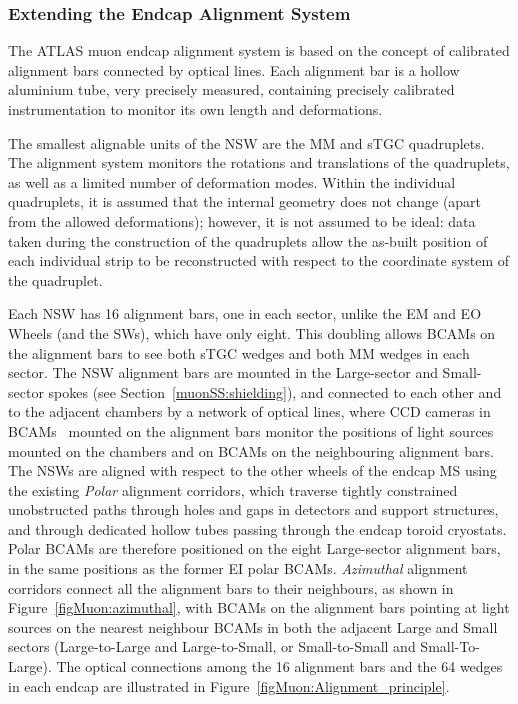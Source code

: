 \documentclass[cernpreprint, atlasdraft=false, UKenglish,british,orcidlogo, texmf, orcidlogo]{atlasdoc}
\begin{document}
\subsubsection{Extending the Endcap Alignment System \label{muonSS:alignment}} 
The ATLAS muon endcap alignment system\cite{Aefsky_2008} is based on the concept of calibrated alignment bars connected by optical lines.
Each alignment bar is a hollow aluminium tube, very precisely measured, containing precisely calibrated instrumentation to monitor its own length and deformations.
 
The smallest alignable units of the \gls{NSW} are the \gls{MM} and \gls{sTGC} quadruplets.
The alignment system monitors the rotations and translations of the quadruplets, as well as a limited number of deformation modes.
Within the individual quadruplets, it is assumed that the internal geometry does not change (apart from the allowed deformations); however, it is not assumed to be ideal: data taken during the construction of the quadruplets allow the as-built position of each individual strip to be reconstructed with respect to the coordinate system of the quadruplet.
 
Each \gls{NSW} has \num{16} alignment bars, one in each sector, unlike the EM and EO Wheels (and the \glspl{SW}), which have only eight.
This doubling allows \glspl{BCAM} on the alignment bars to see both \gls{sTGC} wedges and both \gls{MM}
wedges in each sector.
The \gls{NSW} alignment bars are mounted in the Large-sector and Small-sector spokes (see Section~\ref{muonSS:shielding}), and connected to each other and to the adjacent chambers by a network of optical lines, where CCD cameras in \glspl{BCAM}~\cite{Aefsky_2008} mounted on the alignment bars monitor the positions of light sources mounted on the chambers and on \glspl{BCAM} on the neighbouring alignment bars.
The \glspl{NSW} are aligned with respect to the other wheels of the endcap \gls{MS} using the existing
{\em Polar} alignment corridors, which traverse tightly constrained unobstructed paths through holes and gaps in detectors and support structures, and through dedicated hollow tubes passing through the endcap toroid cryostats.
Polar \glspl{BCAM} are therefore positioned on the eight Large-sector alignment bars, in the same positions as the former EI polar \glspl{BCAM}.
{\em Azimuthal} alignment corridors connect all the alignment bars to their neighbours, as shown in Figure~\ref{figMuon:azimuthal}, with \glspl{BCAM} on the alignment bars pointing at light sources on the nearest neighbour \glspl{BCAM} in both the adjacent Large and Small sectors (Large-to-Large and Large-to-Small, or Small-to-Small and Small-To-Large).
The optical connections among the \num{16} alignment bars and the \num{64} wedges in each endcap are illustrated in Figure~\ref{figMuon:Alignment_principle}.
 
\end{document}
